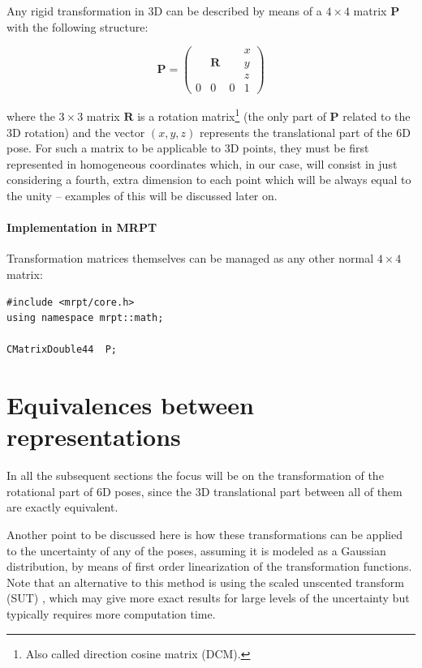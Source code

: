 \documentclass[a4paper,10pt]{report}
\begin{document}
Any rigid transformation in 3D can be described by means of a $4 \times 4$ 
matrix $\mathbf{P}$ with the following structure:

\begin{equation}
\mathbf{P}=\left(
  \begin{array}{ccc|c}
   & & & x \\
   & \mathbf{R} & & y \\
   & & & z \\ \hline
   0 & 0 & 0& 1
  \end{array}
\right)
\end{equation}

\noindent where the $3 \times 3$ matrix $\mathbf{R}$ is 
a rotation matrix\footnote{Also called direction cosine matrix (DCM).} 
(the only part of $\mathbf{P}$ related to 
the 3D rotation) and the vector $(x,y,z)$ represents the translational part of the 6D pose. 
For such a matrix to be applicable to 3D points, they must be first represented in 
homogeneous coordinates \cite{bloomenthal1994homogeneous} which, in our case, will consist in just considering a fourth,
extra dimension to each point which will be always equal to the unity -- examples of this will be discussed later on. 


\subsubsection{Implementation in MRPT}

Transformation matrices themselves can be managed as any other normal $4\times 4$ matrix:

\begin{lstlisting}
#include <mrpt/core.h> 
using namespace mrpt::math; 

CMatrixDouble44  P;
\end{lstlisting}




\chapter{Equivalences between representations}

In all the subsequent sections the focus will be on the transformation of the rotational part of 6D poses, since
the 3D translational part between all of them are exactly equivalent. 

Another point to be discussed here is how these transformations can be applied to the uncertainty 
of any of the poses, 
assuming it is modeled as a Gaussian distribution, by means of first 
order linearization of the transformation functions. 
Note that an alternative to this method is using the scaled unscented 
transform (SUT) \cite{julier2002sut}, which may give more exact results for 
large levels of the uncertainty but typically requires more computation time.
\end{document}
